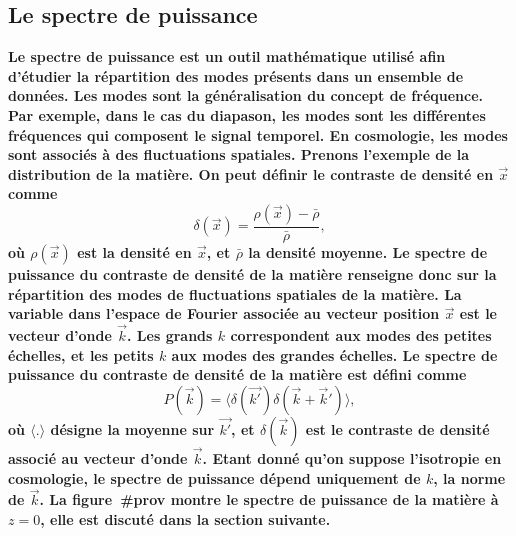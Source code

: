 \documentclass[11pt, twoside, a4paper, openright]{report}
\begin{document}
\subsection{Le spectre de puissance}

\textbf{
  Le spectre de puissance est un outil mathématique utilisé afin d'étudier la répartition des modes présents dans un ensemble de données. Les modes sont la généralisation du concept de fréquence. Par exemple, dans le cas du diapason, les modes sont les différentes fréquences qui composent le signal temporel. En cosmologie, les modes sont associés à des fluctuations spatiales. Prenons l'exemple de la distribution de la matière. On peut définir le contraste de densité en $\vec x$ comme
\begin{equation}
  \label{eq:contraste}
  \delta(\vec x) = \frac{\rho(\vec x) - \bar \rho}{\bar\rho} ,
\end{equation}
où $\rho(\vec x)$ est la densité en $\vec x$, et $\bar \rho$ la densité moyenne. Le spectre de puissance du contraste de densité de la matière renseigne donc sur la répartition des modes de fluctuations spatiales de la matière. La variable dans l'espace de Fourier associée au vecteur position $\vec x$ est le vecteur d'onde $\vec k$. Les grands $k$ correspondent aux modes des petites échelles, et les petits $k$ aux modes des grandes échelles. Le spectre de puissance du contraste de densité de la matière est défini comme
\begin{equation}
  \label{eq:def_pow_spec}
  P(\vec{k}) = \langle \delta(\vec{k'}) \delta(\vec{k}+\vec{k}') \rangle,
\end{equation}
où $\langle.\rangle$ désigne la moyenne sur $\vec{k'}$, et $\delta(\vec{k})$ est le contraste de densité associé au vecteur d'onde $\vec{k}$. Etant donné qu'on suppose l'isotropie en cosmologie, le spectre de puissance dépend uniquement de $k$, la norme de $\vec{k}$. La figure~\#prov montre le spectre de puissance de la matière à $z=0$, elle est discuté dans la section suivante.
}
\end{document}
